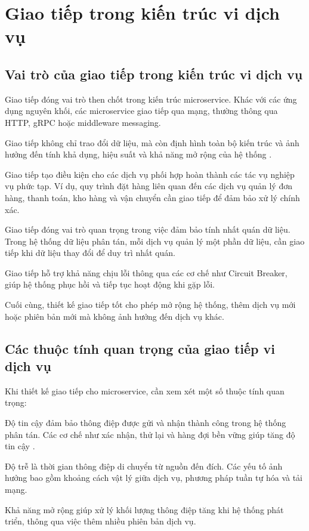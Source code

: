\section{Giao tiếp trong kiến trúc vi dịch vụ}

\subsection{Vai trò của giao tiếp trong kiến trúc vi dịch vụ}
Giao tiếp đóng vai trò then chốt trong kiến trúc microservice. Khác với các ứng
dụng nguyên khối, các microservice giao tiếp qua mạng, thường thông qua HTTP, gRPC hoặc middleware messaging.

Giao tiếp không chỉ trao đổi dữ liệu, mà còn định hình toàn bộ kiến trúc và ảnh hưởng đến tính khả dụng, hiệu suất và khả năng mở rộng của hệ thống \cite{wolff2016}.

Giao tiếp tạo điều kiện cho các dịch vụ phối hợp hoàn thành các tác vụ nghiệp vụ phức tạp. Ví dụ, quy trình đặt hàng liên quan đến các dịch vụ quản lý đơn hàng, thanh toán, kho hàng và vận chuyển cần giao tiếp để đảm bảo xử lý chính xác.

Giao tiếp đóng vai trò quan trọng trong việc đảm bảo tính nhất quán dữ liệu. Trong hệ thống dữ liệu phân tán, mỗi dịch vụ quản lý một phần dữ liệu, cần giao tiếp khi dữ liệu thay đổi để duy trì nhất quán.

Giao tiếp hỗ trợ khả năng chịu lỗi thông qua các cơ chế như Circuit Breaker, giúp hệ thống phục hồi và tiếp tục hoạt động khi gặp lỗi.

Cuối cùng, thiết kế giao tiếp tốt cho phép mở rộng hệ thống, thêm dịch vụ mới hoặc phiên bản mới mà không ảnh hưởng đến dịch vụ khác.

\subsection{Các thuộc tính quan trọng của giao tiếp vi dịch vụ}
Khi thiết kế giao tiếp cho microservice, cần xem xét một số thuộc tính quan trọng:

Độ tin cậy đảm bảo thông điệp được gửi và nhận thành công trong hệ thống phân tán. Các cơ chế như xác nhận, thử lại và hàng đợi bền vững giúp tăng độ tin cậy \cite{hohpe2004}.

Độ trễ là thời gian thông điệp di chuyển từ nguồn đến đích. Các yếu tố ảnh hưởng bao gồm khoảng cách vật lý giữa dịch vụ, phương pháp tuần tự hóa và tải mạng.

Khả năng mở rộng giúp xử lý khối lượng thông điệp tăng khi hệ thống phát triển, thông qua việc thêm nhiều phiên bản dịch vụ.

